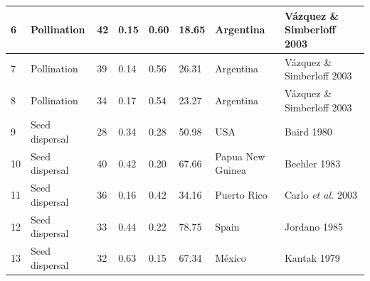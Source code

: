 \documentclass[a4paper, 12pt]{article}
\begin{document}
\begin{table}[H]
\begin{adjustbox}{width=\columnwidth,center}
{\begin{tabular}{|l|l|l|l|l|l|l|l|}
6                                  & Pollination                        & 42                              & 0.15                            & 0.60                            & 18.65                              & Argentina                              & Vázquez \& Simberloff 2003                      \\ \hline
7                                  & Pollination                        & 39                              & 0.14                            & 0.56                            & 26.31                              & Argentina                              & Vázquez \& Simberloff 2003                       \\ \hline
8                                  & Pollination                        & 34                              & 0.17                            & 0.54                            & 23.27                              & Argentina                              & Vázquez \& Simberloff 2003                       \\ \hline
9                                  & Seed dispersal                     & 28                              & 0.34                            & 0.28                            & 50.98                              & USA                                    & Baird 1980                                      \\ \hline
10                                 & Seed dispersal                     & 40                              & 0.42                            & 0.20                            & 67.66                              & Papua New Guinea                       & Beehler 1983                                    \\ \hline
11                                 & Seed dispersal                     & 36                              & 0.16                            & 0.42                            & 34.16                              & Puerto Rico                            & Carlo \textit{et al.} 2003                               \\ \hline
12                                 & Seed dispersal                     & 33                              & 0.44                            & 0.22                            & 78.75                              & Spain                                  & Jordano 1985                                    \\ \hline
13                                 & Seed dispersal                     & 32                              & 0.63                            & 0.15                            & 67.34                              & México                                 & Kantak 1979                                     \\ \hline

\end{tabular}}
\end{adjustbox}
\end{table}
\end{document}
